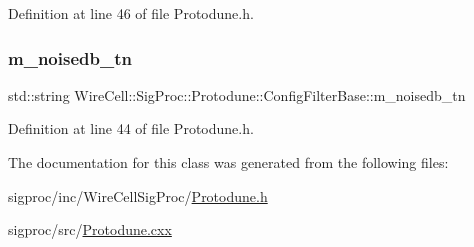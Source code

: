 Definition at line 46 of file Protodune.\+h.

\mbox{\label{class_wire_cell_1_1_sig_proc_1_1_protodune_1_1_config_filter_base_a7db12939221989208e6ebc9340e18581}} 
\subsubsection{\texorpdfstring{m\+\_\+noisedb\+\_\+tn}{m\_noisedb\_tn}}
{\footnotesize\ttfamily std\+::string Wire\+Cell\+::\+Sig\+Proc\+::\+Protodune\+::\+Config\+Filter\+Base\+::m\+\_\+noisedb\+\_\+tn\hspace{0.3cm}{\ttfamily [protected]}}



Definition at line 44 of file Protodune.\+h.



The documentation for this class was generated from the following files\+:\begin{DoxyCompactItemize}
\item 
sigproc/inc/\+Wire\+Cell\+Sig\+Proc/\hyperlink{_protodune_8h}{Protodune.\+h}\item 
sigproc/src/\hyperlink{_protodune_8cxx}{Protodune.\+cxx}\end{DoxyCompactItemize}
